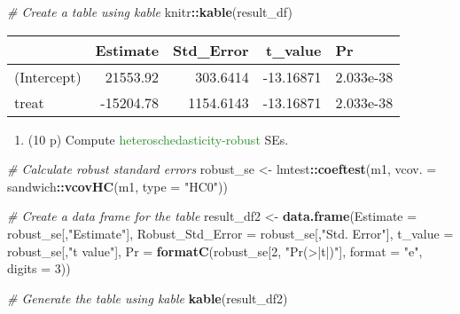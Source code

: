 \documentclass[
]{article}
\newenvironment{Shaded}{\begin{snugshade}}{\end{snugshade}}
\newcommand{\AttributeTok}[1]{\textcolor[rgb]{0.13,0.29,0.53}{#1}}
\newcommand{\CommentTok}[1]{\textcolor[rgb]{0.56,0.35,0.01}{\textit{#1}}}
\newcommand{\DecValTok}[1]{\textcolor[rgb]{0.00,0.00,0.81}{#1}}
\newcommand{\FunctionTok}[1]{\textcolor[rgb]{0.13,0.29,0.53}{\textbf{#1}}}
\newcommand{\NormalTok}[1]{#1}
\newcommand{\OtherTok}[1]{\textcolor[rgb]{0.56,0.35,0.01}{#1}}
\newcommand{\SpecialCharTok}[1]{\textcolor[rgb]{0.81,0.36,0.00}{\textbf{#1}}}
\newcommand{\StringTok}[1]{\textcolor[rgb]{0.31,0.60,0.02}{#1}}
\providecommand{\tightlist}{%
  \setlength{\itemsep}{0pt}\setlength{\parskip}{0pt}}
\begin{document}
\begin{enumerate}
\begin{Shaded}
\begin{Highlighting}[]
\CommentTok{\# Create a table using kable}
\NormalTok{knitr}\SpecialCharTok{::}\FunctionTok{kable}\NormalTok{(result\_df)}
\end{Highlighting}
\end{Shaded}

  \begin{longtable}[]{@{}lrrrl@{}}
  \toprule\noalign{}
  & Estimate & Std\_Error & t\_value & Pr \\
  \midrule\noalign{}
  \endhead
  \bottomrule\noalign{}
  \endlastfoot
  (Intercept) & 21553.92 & 303.6414 & -13.16871 & 2.033e-38 \\
  treat & -15204.78 & 1154.6143 & -13.16871 & 2.033e-38 \\
  \end{longtable}

  \begin{enumerate}
  \def\labelenumii{\alph{enumii}.}
  \setcounter{enumii}{1}
  \tightlist
  \item
    (10 p) Compute \textcolor{ForestGreen}{heteroschedasticity-robust}
    SEs.
  \end{enumerate}

\begin{Shaded}
\begin{Highlighting}[]
\CommentTok{\# Calculate robust standard errors}
\NormalTok{robust\_se }\OtherTok{\textless{}{-}}\NormalTok{ lmtest}\SpecialCharTok{::}\FunctionTok{coeftest}\NormalTok{(m1, }\AttributeTok{vcov. =}\NormalTok{ sandwich}\SpecialCharTok{::}\FunctionTok{vcovHC}\NormalTok{(m1, }\AttributeTok{type =} \StringTok{"HC0"}\NormalTok{))}

\CommentTok{\# Create a data frame for the table}
\NormalTok{result\_df2 }\OtherTok{\textless{}{-}} \FunctionTok{data.frame}\NormalTok{(}\AttributeTok{Estimate =}\NormalTok{ robust\_se[,}\StringTok{"Estimate"}\NormalTok{],}
                        \AttributeTok{Robust\_Std\_Error =}\NormalTok{ robust\_se[,}\StringTok{"Std. Error"}\NormalTok{],}
                        \AttributeTok{t\_value =}\NormalTok{ robust\_se[,}\StringTok{"t value"}\NormalTok{],}
                        \AttributeTok{Pr =} \FunctionTok{formatC}\NormalTok{(robust\_se[}\DecValTok{2}\NormalTok{, }\StringTok{"Pr(\textgreater{}|t|)"}\NormalTok{],}
                                    \AttributeTok{format =} \StringTok{"e"}\NormalTok{,}
                                    \AttributeTok{digits =} \DecValTok{3}\NormalTok{))}

\CommentTok{\# Generate the table using kable}
\FunctionTok{kable}\NormalTok{(result\_df2)}
\end{Highlighting}
\end{Shaded}


\end{enumerate}
\end{document}
